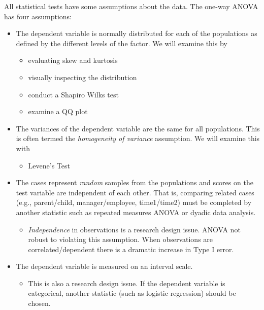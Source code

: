 \documentclass[
  english,
]{book}
\providecommand{\tightlist}{%
  \setlength{\itemsep}{0pt}\setlength{\parskip}{0pt}}
\begin{document}
All statistical tests have some assumptions about the data. The one-way ANOVA has four assumptions:

\begin{itemize}
\tightlist
\item
  The dependent variable is normally distributed for each of the populations as defined by the different levels of the factor. We will examine this by

  \begin{itemize}
  \tightlist
  \item
    evaluating skew and kurtosis
  \item
    visually inspecting the distribution
  \item
    conduct a Shapiro Wilks test
  \item
    examine a QQ plot
  \end{itemize}
\item
  The variances of the dependent variable are the same for all populations. This is often termed the \emph{homogeneity of variance} assumption. We will examine this with

  \begin{itemize}
  \tightlist
  \item
    Levene's Test
  \end{itemize}
\item
  The cases represent \emph{random} samples from the populations and scores on the test variable are independent of each other. That is, comparing related cases (e.g., parent/child, manager/employee, time1/time2) must be completed by another statistic such as repeated measures ANOVA or dyadic data analysis.

  \begin{itemize}
  \tightlist
  \item
    \emph{Independence} in observations is a research design issue. ANOVA not robust to violating this assumption. When observations are correlated/dependent there is a dramatic increase in Type I error.
  \end{itemize}
\item
  The dependent variable is measured on an interval scale.

  \begin{itemize}
  \tightlist
  \item
    This is also a research design issue. If the dependent variable is categorical, another statistic (such as logistic regression) should be chosen.
  \end{itemize}
\end{itemize}
\end{document}
